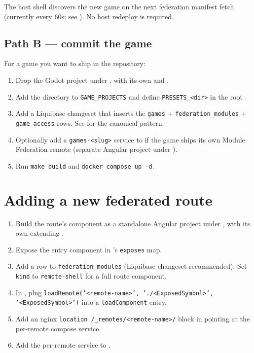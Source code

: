 The host shell discovers the new game on the next federation manifest
fetch (currently every 60s; see ). No host
redeploy is required.

\subsection{Path B — commit the game}

For a game you want to ship in the repository:

\begin{enumerate}
  \item Drop the Godot project under
        , with its own
         and
        .
  \item Add the directory to \texttt{GAME\_PROJECTS} and define
        \texttt{PRESETS\_<dir>} in the root .
  \item Add a Liquibase changeset that inserts the \texttt{games} +
        \texttt{federation\_modules} + \texttt{game\_access} rows. See
        for the canonical pattern.
  \item Optionally add a \texttt{games-<slug>} service to
         if the game ships its own
        Module Federation remote (separate Angular project under
        ).
  \item Run \texttt{make build} and \texttt{docker compose up -d}.
\end{enumerate}

\section{Adding a new federated route}

\begin{enumerate}
  \item Build the route's component as a standalone Angular project
        under , with its own
         extending
        .
  \item Expose the entry component in
        's
        \texttt{exposes} map.
  \item Add a row to \texttt{federation\_modules} (Liquibase changeset
        recommended). Set \texttt{kind} to \texttt{remote-shell} for a
        full route component.
  \item In , plug
        \texttt{loadRemote('<remote-name>', './<ExposedSymbol>',
        '<ExposedSymbol>')} into a \texttt{loadComponent} entry.
  \item Add an nginx \texttt{location /\_remotes/<remote-name>/} block
        in  pointing at the per-remote
        compose service.
  \item Add the per-remote service to .
\end{enumerate}

